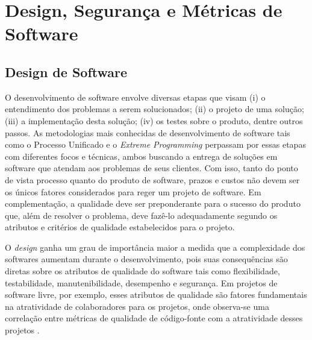 \chapter{Design, Segurança e Métricas de Software}
\label{cap-metrics}

\section{Design de Software}
\label{sec-design-sw}

O desenvolvimento de software envolve diversas etapas que visam (i) o entendimento dos problemas a serem solucionados; (ii) o projeto de uma solução; (iii) a implementação desta solução; (iv) os testes sobre o produto, dentre outros passos.
%
As metodologias mais conhecidas de desenvolvimento de software tais como o Processo Unificado e o \emph{Extreme Programming} perpassam por essas etapas com diferentes focos e técnicas, ambos buscando a entrega de soluções em software que atendam aos problemas de seus clientes.
%
Com isso, tanto do ponto de vista processo quanto do produto de software, prazos e custos não devem ser os únicos fatores considerados para reger um projeto de software. Em complementação, a qualidade deve ser preponderante para o sucesso do produto que, além de resolver o problema, deve fazê-lo adequadamente segundo os atributos e critérios de qualidade estabelecidos para o projeto.

%

O \emph{design} ganha um grau de importância maior a medida que a complexidade dos softwares aumentam durante o desenvolvimento, pois suas consequências são diretas sobre os atributos de qualidade do software tais como flexibilidade, testabilidade, manutenibilidade, desempenho e segurança. Em projetos de software livre, por exemplo, esses atributos de qualidade são fatores fundamentais na atratividade de colaboradores para os projetos, onde observa-se uma correlação entre métricas de qualidade de código-fonte com a atratividade desses projetos \cite{meirelles2010sbes}. 


